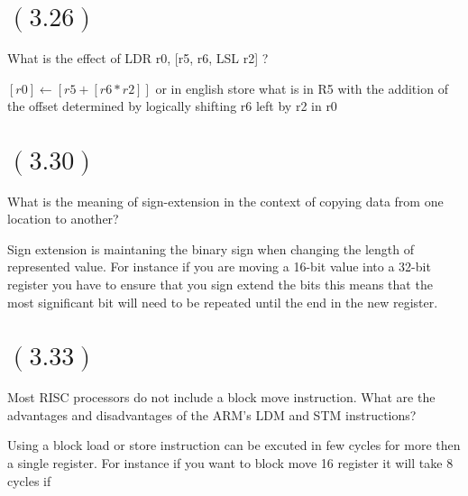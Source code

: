 \documentclass[letterpaper,12pt,titlepage]{article}
\begin{document}
\section*{$(3.26)$} What is the effect of LDR r0, [r5, r6, LSL r2] ?

\begin{mdframed}[style=MyFrame]
$[r0] \leftarrow [r5+[r6 * r2] ]$ or in english store what is in R5 with the addition of the offset determined by logically shifting r6 left by r2 in r0
\end{mdframed}

\section*{$(3.30)$} What is the meaning of sign-extension in the context of copying data from one location to another?

\begin{mdframed}[style=MyFrame]
Sign extension is maintaning the binary sign when changing the length of represented value. For instance if you are moving a 16-bit value into a 32-bit register you have to ensure that you sign extend the bits this means that the most significant bit will need to be repeated until the end in the new register.  
\end{mdframed}

\section*{$(3.33)$} Most RISC processors do not include a block move instruction. What are the advantages and disadvantages of the ARM's LDM and STM instructions?

\begin{mdframed}[style=MyFrame]
Using a block load or store instruction can be excuted in few cycles for more then a single register. For instance if you want to block move 16 register it will take 8 cycles if 
\end{mdframed}

\newpage
\end{document}
